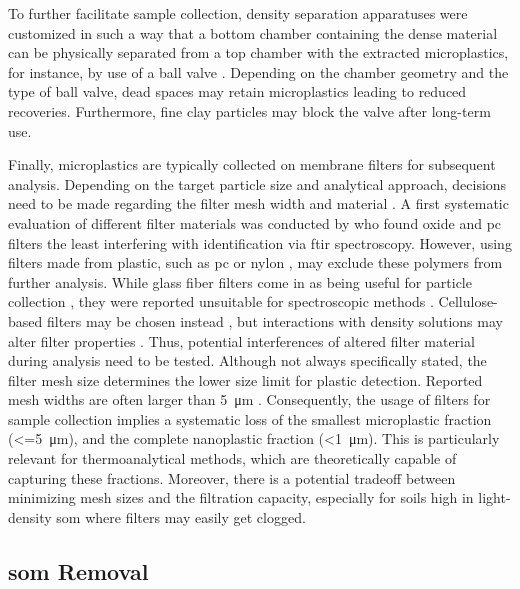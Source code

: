 To further facilitate sample collection, density separation apparatuses were customized in such a way that a bottom chamber containing the dense material can be physically separated from a top chamber with the extracted microplastics, for instance, by use of a ball valve \citep{ImhofNovel2012,ZobkovEvaluation2017,CoppockSmallscale2017,MahatSeparation2017}.
Depending on the chamber geometry and the type of ball valve, dead spaces may retain microplastics leading to reduced recoveries. Furthermore, fine clay particles may block the valve after long-term use.

Finally, microplastics are typically collected on membrane filters for subsequent analysis. Depending on the target particle size and analytical approach, decisions need to be made regarding the filter mesh width and material \citep{MintenigIdentification2017,LoderFocal2015}. A first systematic evaluation of different filter materials was conducted by \citet{LoderFocal2015} who found  oxide and \ac{pc} filters the least interfering with identification via \ac{ftir} spectroscopy. However, using filters made from plastic, such as
\ac{pc} \citep{LoderFocal2015} or nylon \citep{LiuMicroplastic2018}, may exclude these polymers from further analysis. While glass fiber filters come in as being useful for particle collection \citep{HuangAgricultural2020,ChenMixing2020}, they were reported unsuitable for spectroscopic methods \citep{LoderFocal2015}. Cellulose-based filters may be chosen instead \citep{ZhouMicroplastics2020,CorradiniEvidence2019,vandenBergSewage2020}, but interactions with density solutions may alter filter properties \citep{QuinnValidation2017}. Thus, potential interferences of altered filter material during analysis need to be tested. Although not always specifically stated, the filter mesh size determines the lower size limit for plastic detection. Reported mesh widths are often larger than \SI{5}{\micro\meter} \citep{HuangAgricultural2020,ZhouMicroplastics2020}. Consequently, the usage of filters for sample collection implies a systematic loss of the smallest microplastic fraction (\SI{<=5}{\micro\meter}), and the complete nanoplastic fraction (\SI{<1}{\micro\meter}). This is particularly relevant for thermoanalytical methods, which are theoretically capable of capturing these fractions. Moreover, there is a potential tradeoff between minimizing mesh sizes and the filtration capacity, especially for soils high in light-density \ac{som} where filters may easily get clogged.

\subsection{\Acs{som} Removal}
\label{sec:analytical-techniques:som-removal}


